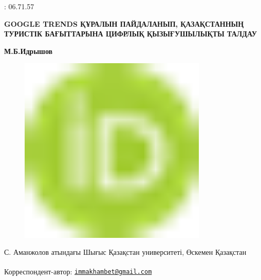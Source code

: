 : 06.71.57

{\bfseries GOOGLE TRENDS ҚҰРАЛЫН ПАЙДАЛАНЫП, ҚАЗАҚСТАННЫҢ ТУРИСТІК
БАҒЫТТАРЫНА ЦИФРЛЫҚ ҚЫЗЫҒУШЫЛЫҚТЫ ТАЛДАУ}

{\bfseries М.Б.Идрышов}
\begin{figure}[H]
	\centering
	\includegraphics[width=0.8\textwidth]{media/ekon2/image1}
	\caption*{}
\end{figure}


С. Аманжолов атындағы Шығыс Қазақстан университеті, Өскемен Қазақстан

{\bfseries \textsuperscript{\envelope }}Корреспондент-автор:
\href{mailto:immakhambet@gmail.com}{\nolinkurl{immakhambet@gmail.com}}

